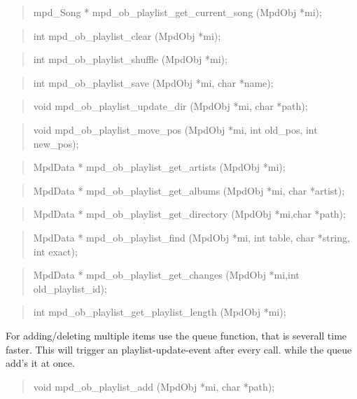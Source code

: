 \documentclass[a4paper,11pt]{article}
\begin{document}
\begin{quote}
mpd\_Song * 	mpd\_ob\_playlist\_get\_current\_song	(MpdObj *mi);
\end{quote}

\begin{quote}
int 		mpd\_ob\_playlist\_clear			(MpdObj *mi);
\end{quote}

\begin{quote}
int 		mpd\_ob\_playlist\_shuffle			(MpdObj *mi);
\end{quote}

\begin{quote}
int 		mpd\_ob\_playlist\_save			(MpdObj *mi, char *name);
\end{quote}

\begin{quote}
void 		mpd\_ob\_playlist\_update\_dir		(MpdObj *mi, char *path);
\end{quote}

\begin{quote}
void 		mpd\_ob\_playlist\_move\_pos		(MpdObj *mi, int old\_pos, int new\_pos);
\end{quote}

\begin{quote}
MpdData * 	mpd\_ob\_playlist\_get\_artists		(MpdObj *mi);
\end{quote}

\begin{quote}
MpdData *	mpd\_ob\_playlist\_get\_albums		(MpdObj *mi, char *artist);
\end{quote}

\begin{quote}
MpdData * 	mpd\_ob\_playlist\_get\_directory		(MpdObj *mi,char *path);
\end{quote}

\begin{quote}
MpdData * 	mpd\_ob\_playlist\_find			(MpdObj *mi, int table, char *string, int exact);
\end{quote}

\begin{quote}
MpdData * 	mpd\_ob\_playlist\_get\_changes		(MpdObj *mi,int old\_playlist\_id);
\end{quote}
\begin{quote}
int		mpd\_ob\_playlist\_get\_playlist\_length	(MpdObj *mi);
\end{quote}

For adding/deleting multiple items use the queue function, that is severall time faster.
This will trigger an playlist-update-event after every call. while the queue add's it at once.
\begin{quote}
void		mpd\_ob\_playlist\_add			(MpdObj *mi, char *path);
\end{quote}
\end{document}
